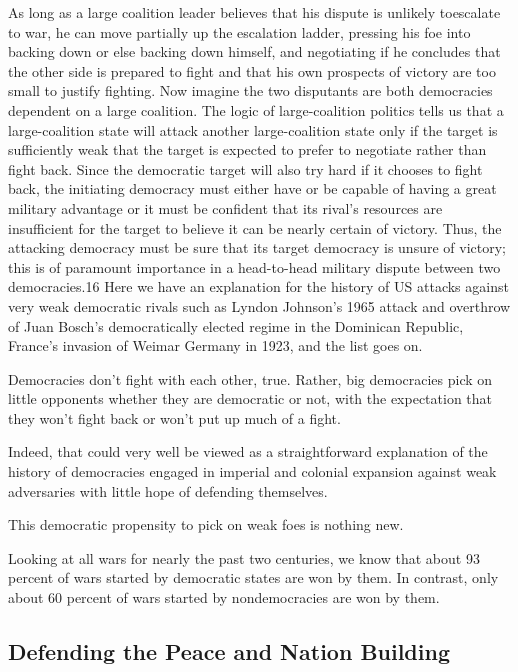 \documentclass[10pt]{article}
\begin{document}
{\large As long as a large coalition leader believes that his dispute is
unlikely toescalate to war, he can move partially up the escalation ladder,
pressing his foe into backing down or else backing down himself, and negotiating
if he concludes that the other side is prepared to fight and that his own
prospects of victory are too small to justify fighting. Now imagine the two
disputants are both democracies dependent on a large coalition. The logic of
large-coalition politics tells us that a large-coalition state will attack
another large-coalition state only if the target is sufficiently weak that the
target is expected to prefer to negotiate rather than fight back. Since the
democratic target will also try hard if it chooses to fight back, the initiating
democracy must either have or be capable of having a great military advantage or
it must be confident that its rival's resources are insufficient for the target
to believe it can be nearly certain of victory. Thus, the attacking democracy
must be sure that its target democracy is unsure of victory; this is of paramount
importance in a head-to-head military dispute between two democracies.16 Here we
have an explanation for the history of US attacks against very weak democratic
rivals such as Lyndon Johnson's 1965 attack and overthrow of Juan Bosch's
democratically elected regime in the Dominican Republic, France's invasion of
Weimar Germany in 1923, and the list goes on.}

{\large Democracies don't fight with each other, true. Rather, big democracies
pick on little opponents whether they are democratic or not, with the expectation
that they won't fight back or won't put up much of a fight.}

{\large Indeed, that could very well be viewed as a straightforward explanation
of the history of democracies engaged in imperial and colonial expansion against
weak adversaries with little hope of defending themselves.}

{\large This democratic propensity to pick on weak foes is nothing new.}

{\large Looking at all wars for nearly the past two centuries, we know that
about 93 percent of wars started by democratic states are won by them. In
contrast, only about 60 percent of wars started by nondemocracies are won by
them.}

\subsection{Defending the Peace and Nation Building}
\end{document}

